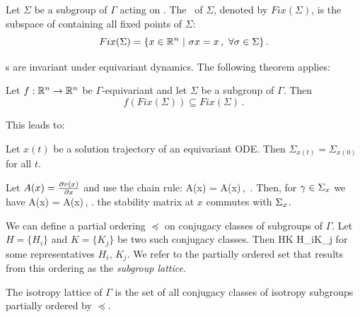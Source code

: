 \begin{definition}
 \label{def:fixedsp}
  Let $\Sigma$ be a subgroup of $\Gamma$ acting on . The \fixedsp\ of $\Sigma$,
 denoted by $Fix(\Sigma)$, is the subspace of  containing all fixed points of $\Sigma$:
\[
	Fix(\Sigma)=\{x\in\mathbb{R}^{n}\ |\ \sigma x = x\,,\ \forall \sigma\in\Sigma\}\,.
\]
\end{definition}

\Fixedsp s are invariant under equivariant dynamics. The following theorem applies:

\begin{theorem}
 Let $f:\mathbb{R}^{n}\rightarrow\mathbb{R}^{n}$ be $\Gamma$-equivariant and let $\Sigma$ be a subgroup of $\Gamma$. Then
\[
 f\left(Fix(\Sigma)\right)\subseteq Fix(\Sigma)\,.
\]
\end{theorem}

This leads to:
\begin{proposition}
 Let $x(t)$ be a solution trajectory of an equivariant ODE. Then $\Sigma_{x(t)}=\Sigma_{x(0)}$ for all $t$.
\label{pro:gfInv}
\end{proposition}

Let $A(x)=\frac{\partial v(x)}{\partial x}$ and use the chain rule:
\beq
	A(\gamma x) \gamma = \gamma A(x)\,, \qquad \gamma\in\Gamma\,.
	\label{eq:LrzGroupOrb} 
\eeq
Then, for $\gamma\in\Sigma_{x}$ we have
\beq
	A(x) \gamma = \gamma A(x)\,, \qquad \gamma\in{}.
	\label{eq:LrzCommut}
\eeq
\ie the stability matrix at $x$ commutes with $\Sigma_{x}$.

We can define a partial ordering $\preceq$ on conjugacy classes of subgroups of $\Gamma$. Let $H=\{H_i\}$ and $K=\{K_j\}$
be two such conjugacy classes. Then
\beq
	H\preceq K \Leftrightarrow H_i\subseteq K_j
	\label{eq:Gorder}
\eeq
for some representatives $H_i,\,K_j$. We refer to the partially ordered set that results from this ordering as the \emph{subgroup lattice}.

\begin{definition}
 The isotropy lattice of $\Gamma$ is the set of all conjugacy classes of isotropy subgroups
 partially ordered by $\preceq$.
\end{definition}

